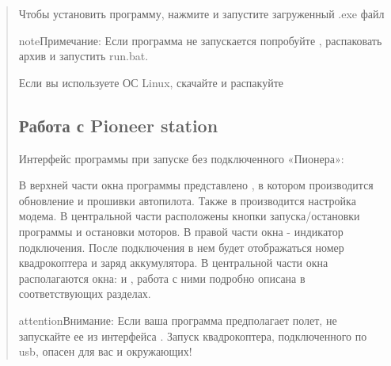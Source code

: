 \documentclass[a4paper,10pt,russian]{sphinxmanual}
\begin{document}
\begin{quote}
\begin{itemize}
\end{itemize}

Чтобы установить программу, нажмите  и запустите загруженный .exe файл

\begin{sphinxadmonition}{note}{Примечание:}
Если программа не запускается попробуйте , распаковать архив и запустить run.bat.
\end{sphinxadmonition}

Если вы используете ОС Linux, скачайте и распакуйте 


\subsection{Работа с Pioneer station}
\label{\detokenize{programming/pioneer_station/pioneer_station_work:pioneer-station}}\label{\detokenize{programming/pioneer_station/pioneer_station_work::doc}}
Интерфейс программы при запуске без подключенного «Пионера»:


В верхней части окна программы представлено , в котором производится обновление  и прошивки автопилота.
Также в  производится настройка модема. В центральной части расположены кнопки запуска/остановки программы и остановки моторов.
В правой части окна - индикатор подключения. После подключения в нем будет отображаться номер квадрокоптера и заряд аккумулятора.
В центральной части окна располагаются окна: {\hyperref[\detokenize{programming/pioneer_station/pioneer_station_code_editor::doc}]{}} и {\hyperref[\detokenize{settings/autopilot_parameters::doc}]{}}, работа с ними подробно описана в соответствующих разделах.

\begin{sphinxadmonition}{attention}{Внимание:}
Если ваша программа предполагает полет, не запускайте ее из интерфейса . Запуск квадрокоптера, подключенного по usb, опасен для вас и окружающих!
\end{sphinxadmonition}



\end{quote}
\end{document}
